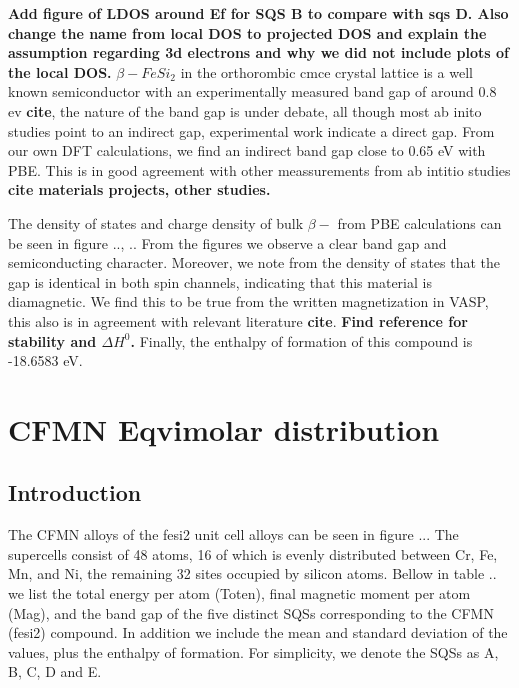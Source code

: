 \textbf{Add figure of LDOS around Ef for SQS B to compare with sqs D. Also change the name from local DOS to projected DOS and explain the assumption regarding 3d electrons and why we did not include plots of the local DOS.}
$\beta-FeSi_2$ in the orthorombic cmce crystal lattice is a well known semiconductor with an experimentally measured band gap of around 0.8 ev \textbf{cite}, the nature of the band gap is under debate, all though most ab inito studies point to an indirect gap, experimental work indicate a direct gap. From our own DFT calculations, we find an indirect band gap close to 0.65 eV with PBE. This is in good agreement with other meassurements from ab intitio studies \textbf{cite materials projects, other studies.} 

The density of states and charge density of bulk $\beta-$ from PBE calculations can be seen in figure .., ..  From the figures we observe a clear band gap and semiconducting character. Moreover, we note from the density of states that the gap is identical in both spin channels, indicating that this material is diamagnetic. We find this to be true from the written magnetization in VASP, this also is in agreement with relevant literature \textbf{cite}. \textbf{Find reference for stability and $\Delta H^0$.} Finally, the enthalpy of formation of this compound is -18.6583 eV.

\section{CFMN Eqvimolar distribution}

\subsection{Introduction}

The CFMN alloys of the fesi2 unit cell alloys can be seen in figure ... The supercells consist of 48 atoms, 16 of which is evenly distributed between Cr, Fe, Mn, and Ni, the remaining 32 sites occupied by silicon atoms. Bellow in table .. we list the total energy per atom (Toten), final magnetic moment per atom (Mag), and the band gap of the five distinct SQSs corresponding to the CFMN (fesi2) compound. In addition we include the mean and standard deviation of the values, plus the enthalpy of formation. For simplicity, we denote the SQSs as A, B, C, D and E.

